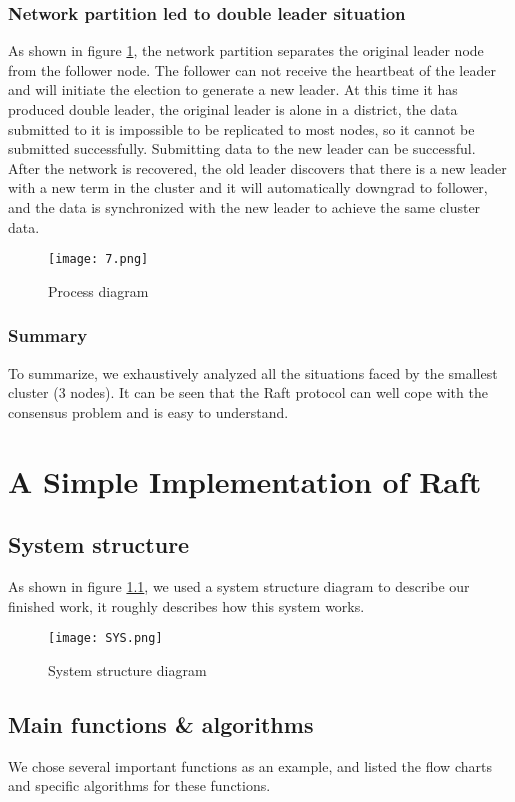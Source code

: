 \documentclass{report}
\begin{document}
\subsection{Network partition led to double leader situation}
As shown in figure \ref{fig:7}, the network partition separates the original leader node from the follower node. The follower can not receive the heartbeat of the leader and will initiate the election to generate a new leader. At this time it has produced double leader, the original leader is alone in a district, the data submitted to it is impossible to be replicated to most nodes, so it cannot be submitted successfully. Submitting data to the new leader can be successful. After the network is recovered, the old leader discovers that there is a new leader with a new term in the cluster and it will automatically downgrad to follower, and the data is synchronized with the new leader to achieve the same cluster data.
\begin{figure}[H]
    \centering
    \texttt{[image: 7.png]}
    \caption{Process diagram}
    \label{fig:7}
\end{figure}

\subsection{Summary}
To summarize, we exhaustively analyzed all the situations faced by the smallest cluster (3 nodes). It can be seen that the Raft protocol can well cope with the consensus problem and is easy to understand.


\chapter{A Simple Implementation of Raft}
\section{System structure}
As shown in figure \ref{fig:SYS}, we used a system structure diagram to describe our finished work, it roughly describes how this system works.
\begin{figure}[H]
    \centering
    \texttt{[image: SYS.png]}
    \caption{System structure diagram}
    \label{fig:SYS}
\end{figure}

\section{Main functions \& algorithms}
We chose several important functions as an example, and listed the flow charts and specific algorithms for these functions.
\end{document}

